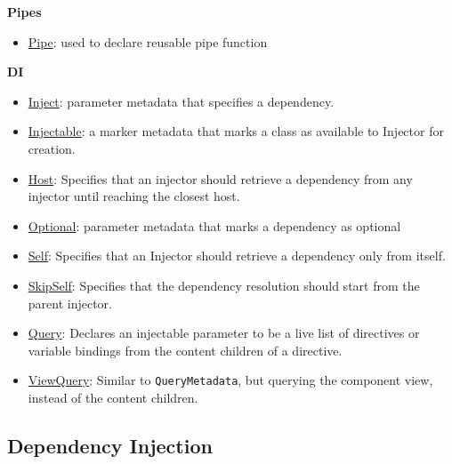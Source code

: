 \documentclass[12pt,]{article}
\providecommand{\tightlist}{%
  \setlength{\itemsep}{0pt}\setlength{\parskip}{0pt}}
\begin{document}
\textbf{Pipes}

\begin{itemize}
\tightlist
\item
  \href{https://angular.io/docs/ts/latest/api/core/PipeMetadata-class.html}{Pipe}:
  used to declare reusable pipe function
\end{itemize}

\textbf{DI}

\begin{itemize}
\tightlist
\item
  \href{https://angular.io/docs/ts/latest/api/core/InjectMetadata-class.html}{Inject}:
  parameter metadata that specifies a dependency.
\item
  \href{https://angular.io/docs/ts/latest/api/core/InjectableMetadata-class.html}{Injectable}:
  a marker metadata that marks a class as available to Injector for
  creation.
\item
  \href{https://angular.io/docs/ts/latest/api/core/HostMetadata-class.html}{Host}:
  Specifies that an injector should retrieve a dependency from any
  injector until reaching the closest host.
\item
  \href{https://angular.io/docs/ts/latest/api/core/OptionalMetadata-class.html}{Optional}:
  parameter metadata that marks a dependency as optional
\item
  \href{https://angular.io/docs/ts/latest/api/core/SelfMetadata-class.html}{Self}:
  Specifies that an Injector should retrieve a dependency only from
  itself.
\item
  \href{https://angular.io/docs/ts/latest/api/core/SkipSelfMetadata-class.html}{SkipSelf}:
  Specifies that the dependency resolution should start from the parent
  injector.
\item
  \href{https://angular.io/docs/ts/latest/api/core/QueryMetadata-class.html}{Query}:
  Declares an injectable parameter to be a live list of directives or
  variable bindings from the content children of a directive.
\item
  \href{https://angular.io/docs/ts/latest/api/core/ViewQueryMetadata-class.html}{ViewQuery}:
  Similar to \texttt{QueryMetadata}, but querying the component view,
  instead of the content children.
\end{itemize}

\subsection{Dependency Injection}\label{dependency-injection}
\end{document}
